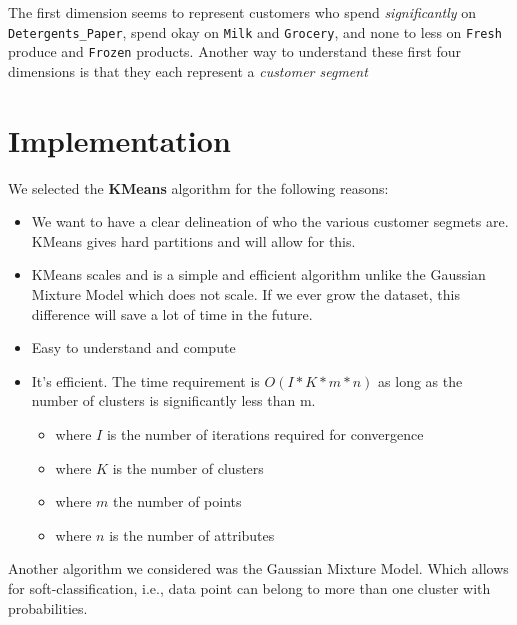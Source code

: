 \documentclass[twoside,openright,titlepage,numbers=noenddot,headinclude,%
               footinclude=true,cleardoublepage=empty,abstractoff,BCOR=5mm,%
               paper=a4,fontsize=11pt,ngerman,american]{scrreprt}
\numberwithin{theorem}{chapter}
\numberwithin{definition}{chapter}
\numberwithin{algorithm}{chapter}
\numberwithin{figure}{chapter}
\numberwithin{table}{chapter}
\numberwithin{equation}{chapter}
\begin{document}
The first dimension seems to represent customers who spend \emph{significantly} on \texttt{Detergents\_Paper}, spend okay on \texttt{Milk} and \texttt{Grocery}, and none to less on \texttt{Fresh} produce and \texttt{Frozen} products. Another way to understand these first four dimensions is that they each represent a \emph{customer segment}

\section*{Implementation}
We selected the \textbf{KMeans} algorithm for the following reasons:
\begin{itemize} 
\item We want to have a clear delineation of who the various customer segmets are. KMeans gives hard partitions and will allow for this.  
\item KMeans scales and is a simple and efficient algorithm unlike the Gaussian Mixture Model which does not scale. If we ever grow the dataset, this difference will save a lot of time in the future.  
\item Easy to understand and compute
\item It's efficient. The time requirement is $O(I*K*m*n)$ as long as the number of clusters is significantly less than m.
  \begin{itemize} 
    \item where $I$ is the number of iterations required for convergence
    \item where $K$ is the number of clusters
    \item where $m$ the number of points
    \item where $n$ is the number of attributes
    \end{itemize}  
\end{itemize} 

Another algorithm we considered was the Gaussian Mixture Model. Which allows for soft-classification, i.e., data point can belong to more than one cluster with probabilities.
   
\end{document}
